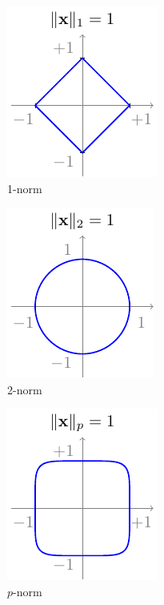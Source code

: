 \begin{figure}[h]
    \centering
    \begin{subfigure}[b]{0.24\textwidth}
        \includegraphics{figure/chapter01/norm1.pdf}
        \caption{1-norm}
        \label{fig:norm1}
    \end{subfigure}
    \begin{subfigure}[b]{0.24\textwidth}
        \centering
        \includegraphics{figure/chapter01/norm2.pdf}
        \caption{2-norm}
        \label{fig:norm2}
    \end{subfigure}
    \begin{subfigure}[b]{0.24\textwidth}
        \centering
        \includegraphics{figure/chapter01/normp.pdf}
        \caption{$p$-norm}
        \label{fig:normp}
    \end{subfigure}
    \begin{subfigure}[b]{0.24\textwidth}

\end{subfigure}
\end{figure}
